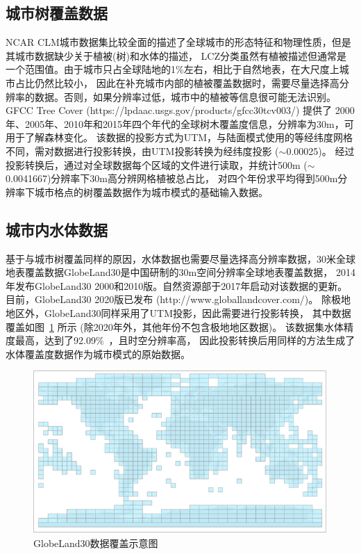 \subsection{城市树覆盖数据}\label{城市树覆盖数据}
NCAR CLM城市数据集比较全面的描述了全球城市的形态特征和物理性质，但是其城市数据缺少关于植被(树)和水体的描述，
LCZ分类虽然有植被描述但通常是一个范围值。由于城市只占全球陆地的1\%左右，相比于自然地表，在大尺度上城市占比仍然比较小，
因此在补充城市内部的植被覆盖数据时，需要尽量选择高分辨率的数据。否则，如果分辨率过低，城市中的植被等信息很可能无法识别。
GFCC Tree Cover (https://lpdaac.usgs.gov/products/gfcc30tcv003/) 提供了
2000年、2005年、2010年和2015年四个年代的全球树木覆盖度信息，分辨率为30m，可用于了解森林变化。
该数据的投影方式为UTM，与陆面模式使用的等经纬度网格不同，需对数据进行投影转换，由UTM投影转换为经纬度投影 ($\sim$0.00025\textdegree)。
经过投影转换后，通过对全球数据每个区域的文件进行读取，并统计500m ($\sim$0.0041667\textdegree)分辨率下30m高分辨网格植被总占比，
对四个年份求平均得到500m分辨率下城市格点的树覆盖数据作为城市模式的基础输入数据。

\subsection{城市内水体数据}\label{城市内水体数据}
基于与城市树覆盖同样的原因，水体数据也需要尽量选择高分辨率数据，30米全球地表覆盖数据GlobeLand30是中国研制的30m空间分辨率全球地表覆盖数据，
2014年发布GlobeLand30 2000和2010版。自然资源部于2017年启动对该数据的更新。目前，GlobeLand30 2020版已发布 (http://www.globallandcover.com/)。
除极地地区外，GlobeLand30同样采用了UTM投影，因此需要进行投影转换，
其中数据覆盖如图~\ref{fig:GlobeLand30数据覆盖示意图} 所示 (除2020年外，其他年份不包含极地地区数据)。
该数据集水体精度最高，达到了92.09\%~\citep{陈军2017}，且时空分辨率高，
因此投影转换后用同样的方法生成了水体覆盖度数据作为城市模式的原始数据。
{
\begin{figure}[]
\centering
\includegraphics{Figures/基础数据/GlobeLand30数据覆盖示意图.png}
\caption{GlobeLand30数据覆盖示意图}
\label{fig:GlobeLand30数据覆盖示意图}
\end{figure}
}

